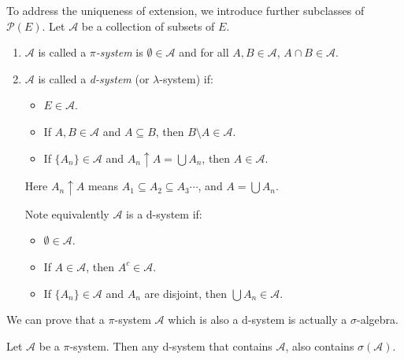 \documentclass[12pt]{article}
\begin{document}
To address the uniqueness of extension, we introduce further subclasses of $\mathcal{P}(E)$. Let $\mathcal{A}$ be a collection of subsets of $E$.
\begin{enumerate}
	\item $\mathcal{A}$ is called a $\pi$\emph{-system} is $\emptyset \in \mathcal{A}$ and for all $A, B \in \mathcal{A}$, $A \cap B \in \mathcal{A}$.
	\item $\mathcal{A}$ is called a \emph{d-system} (or $\lambda$-system) if:
		\begin{itemize}
			\item $E \in \mathcal{A}$.
			\item If $A, B \in \mathcal{A}$ and $A \subseteq B$, then $B\setminus A \in \mathcal{A}$.
			\item If $\{A_n\} \in \mathcal{A}$ and $A_n \uparrow A = \bigcup A_n$, then $A \in \mathcal{A}$.
		\end{itemize}
	Here $A_n \uparrow A$ means $A_1 \subseteq A_2 \subseteq A_3 \cdots$, and $A = \bigcup A_n$.
	
	Note equivalently $\mathcal{A}$ is a d-system if:
	\begin{itemize}
		\item $\emptyset \in \mathcal{A}$.
		\item If $A \in \mathcal{A}$, then $A^{c} \in \mathcal{A}$.
		\item If $\{A_n\} \in \mathcal{A}$ and $A_n$ are disjoint, then $\bigcup A_n \in \mathcal{A}$.
	\end{itemize}
\end{enumerate}

We can prove that a $\pi$-system $\mathcal{A}$ which is also a d-system is actually a $\sigma$-algebra.

\begin{lemma}
	Let $\mathcal{A}$ be a $\pi$-system. Then any d-system that contains $\mathcal{A}$, also contains $\sigma(\mathcal{A})$.
\end{lemma}
\end{document}

